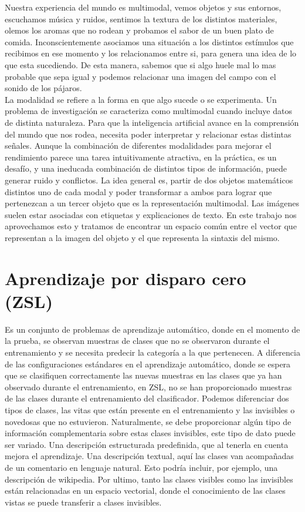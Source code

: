 Nuestra experiencia del mundo es multimodal, vemos objetos y sus entornos, escuchamos música y ruidos, sentimos la textura de los distintos materiales, olemos los aromas que no rodean y probamos el sabor de un buen plato de comida.  Inconscientemente asociamos una situación a los distintos estímulos que recibimos en ese momento y los relacionamos entre si, para genera una idea de lo que esta sucediendo. De esta manera, sabemos que si algo huele mal lo mas probable que sepa igual y podemos relacionar una imagen del campo con el sonido de los pájaros.\\

La modalidad se refiere a la forma en que algo sucede o se experimenta. Un problema de investigación se caracteriza como multimodal cuando incluye datos de distinta naturaleza. Para que la inteligencia artificial avance en la comprensión del mundo que nos rodea, necesita poder interpretar y relacionar estas distintas señales. Aunque la combinación de diferentes modalidades para mejorar el rendimiento parece una tarea intuitivamente atractiva, en la práctica, es un desafío, y una ineducada combinación de distintos tipos de información, puede generar ruido y conflictos. La idea general es, partir de dos objetos matemáticos distintos uno de cada modal y poder transformar a ambos para lograr que pertenezcan a un tercer objeto que es la representación multimodal. Las imágenes suelen estar asociadas con etiquetas y explicaciones de texto. En este trabajo nos aprovechamos esto y tratamos de encontrar un espacio común entre el vector que representan a la imagen del objeto y el que representa la sintaxis del mismo.


\section {Aprendizaje por disparo cero (ZSL)}
Es un conjunto de problemas de aprendizaje automático, donde en el momento de la prueba, se observan muestras de clases que no se observaron durante el entrenamiento y se necesita predecir la categoría a la que pertenecen. A diferencia de las configuraciones estándares en el aprendizaje automático, donde se espera que se clasifiquen correctamente las nuevas muestras en las clases que ya han observado durante el entrenamiento, en ZSL, no se han proporcionado muestras de las clases durante el entrenamiento del clasificador. Podemos diferenciar dos tipos de clases, las vitas que están presente en el entrenamiento y las invisibles o novedosas que no estuvieron. Naturalmente, se debe proporcionar algún tipo de información complementaria sobre estas clases invisibles, este tipo de dato puede ser variado. Una descripción estructurada predefinida, que al tenerla en cuenta mejora el aprendizaje. Una descripción textual, aquí las clases van acompañadas de un comentario en lenguaje natural. Esto podría incluir, por ejemplo, una descripción de wikipedia. Por ultimo, tanto las clases visibles como las invisibles están relacionadas en un espacio vectorial, donde el conocimiento de las clases vistas se puede transferir a clases invisibles.\\

